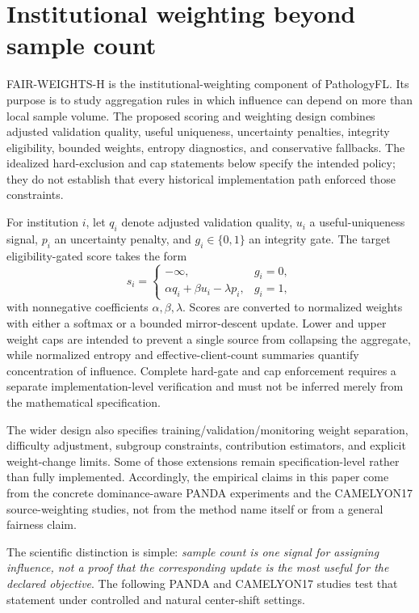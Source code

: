 \section{Institutional weighting beyond sample count}


FAIR-WEIGHTS-H is the institutional-weighting component of PathologyFL. Its purpose is to study aggregation rules in which influence can depend on more than local sample volume. The proposed scoring and weighting design combines adjusted validation quality, useful uniqueness, uncertainty penalties, integrity eligibility, bounded weights, entropy diagnostics, and conservative fallbacks. The idealized hard-exclusion and cap statements below specify the intended policy; they do not establish that every historical implementation path enforced those constraints.

For institution $i$, let $q_i$ denote adjusted validation quality, $u_i$ a useful-uniqueness signal, $p_i$ an uncertainty penalty, and $g_i\in\{0,1\}$ an integrity gate. The target eligibility-gated score takes the form
\[
s_i = \begin{cases}
-\infty, & g_i=0,\\
\alpha q_i+\beta u_i-\lambda p_i, & g_i=1,
\end{cases}
\]
with nonnegative coefficients $\alpha,\beta,\lambda$. Scores are converted to normalized weights with either a softmax or a bounded mirror-descent update. Lower and upper weight caps are intended to prevent a single source from collapsing the aggregate, while normalized entropy and effective-client-count summaries quantify concentration of influence. Complete hard-gate and cap enforcement requires a separate implementation-level verification and must not be inferred merely from the mathematical specification.

The wider design also specifies training/validation/monitoring weight separation, difficulty adjustment, subgroup constraints, contribution estimators, and explicit weight-change limits. Some of those extensions remain specification-level rather than fully implemented. Accordingly, the empirical claims in this paper come from the concrete dominance-aware PANDA experiments and the CAMELYON17 source-weighting studies, not from the method name itself or from a general fairness claim.

The scientific distinction is simple: \emph{sample count is one signal for assigning influence, not a proof that the corresponding update is the most useful for the declared objective}. The following PANDA and CAMELYON17 studies test that statement under controlled and natural center-shift settings.
